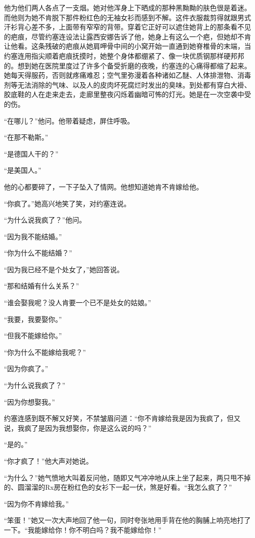     他为他们两人各点了一支烟。她对他浑身上下晒成的那种黑黝黝的肤色很是着迷。而他则为她不肯脱下那件粉红色的无袖女衫而感到不解。这件衣服裁剪得就跟男式汗衫背心差不多，上面带有窄窄的背带。穿着它正好可以遮住她背上的那条看不见的疤痕，尽管约塞连设法让露西安娜告诉了他，她身上有这么一个疤，但她却不肯让他看。这条残破的疤痕从她肩呷骨中间的小窝开始一直通到她脊椎骨的末端，当约塞连用指尖顺着疤痕抚摸时，她整个身体都绷紧了、像一块优质钢那样硬邦邦的。想到她在医院里度过了许多个备受折磨的夜晚，约塞连的心痛得都缩了起来。她每天得服药，否则就疼痛难忍；空气里弥漫着各种诸如乙醚、人体排泄物、消毒剂等无法消除的气味、以及人的皮肉坏死腐烂时发出的臭味。到处都有穿白大褂、胶底鞋的人在走来走去，走廊里整夜闪烁着幽暗可怖的灯光。她是在一次空袭中受的伤。

    “在哪儿？”他问。他带着疑虑，屏住呼吸。

    “在那不勒斯。”

    “是德国人干的？”

    “是美国人。”

    他的心都要碎了，一下子坠入了情网。他想知道她肯不肯嫁给他。

    “你疯了。”她高兴地笑了笑，对约塞连说。

    “为什么说我疯了？”他问。

    “因为我不能结婚。”

    “你为什么不能结婚？”

    “因为我已经不是个处女了，”她回答说。

    “那和结婚有什么关系？”

    “谁会娶我呢？没人肯要一个已不是处女的姑娘。”

    “我要，我要娶你。”

    “但我不能嫁给你。”

    “你为什么不能嫁给我呢？”

    “因为你疯了。”

    “为什么说我疯了？”

    “因为你想娶我。”

    约塞连感到既不解又好笑，不禁皱眉问道：“你不肯嫁给我是因为我疯了，但又说，我疯了是因为我想娶你，你是这么说的吗？”

    “是的。”

    “你才疯了！”他大声对她说。

    “为什么？”她气愤地大叫着反问他，随即又气冲冲地从床上坐了起来，两只甩不掉的、圆溜溜的Rx房在粉红色的女衫下一起一伏，煞是好看。“我怎么疯了？”

    “因为你不肯嫁给我。”

    “笨蛋！”她又一次大声地回了他一句，同时夸张地用手背在他的胸脯上响亮地打了一下。“我能嫁给你！你不明白吗？我不能嫁给你！”


